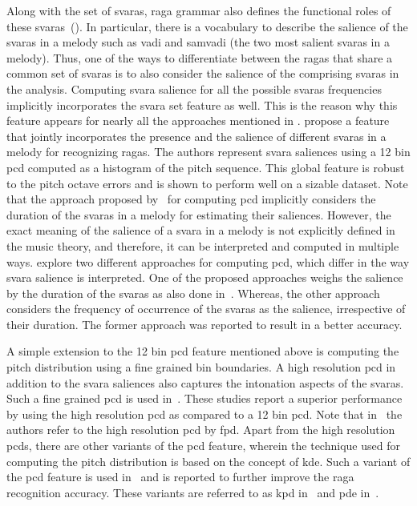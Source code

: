 Along with the set of \glspl{svara}, \gls{raga} grammar also defines the functional roles of these \glspl{svara}~(). In particular, there is a vocabulary to describe the salience of the \glspl{svara} in a melody such as \gls{vadi} and \gls{samvadi} (the two most salient \glspl{svara} in a melody). Thus, one of the ways to differentiate between the \glspl{raga} that share a common set of \glspl{svara} is to also consider the salience of the comprising \glspl{svara} in the analysis. Computing \gls{svara} salience for all the possible \glspl{svara} frequencies implicitly incorporates the \gls{svara} set feature as well. This is the reason why this feature appears for nearly all the approaches mentioned in . \cite{chordia2007raag} propose a feature that jointly incorporates the presence and the salience of different \glspl{svara} in a melody for recognizing \glspl{raga}. The authors represent \gls{svara} saliences using a 12 bin \gls{pcd} computed as a histogram of the pitch sequence. This global feature is robust to the pitch octave errors and is shown to perform well on a sizable dataset. Note that the approach proposed by~\cite{chordia2007raag} for computing \gls{pcd} implicitly considers the duration of the \glspl{svara} in a melody for estimating their saliences. However, the exact meaning of the salience of a \gls{svara} in a melody is not explicitly defined in the music theory, and therefore, it can be interpreted and computed in multiple ways. \cite{koduri2011survey} explore two different approaches for computing \gls{pcd}, which differ in the way \gls{svara} salience is interpreted. One of the proposed approaches weighs the salience by the duration of the \glspl{svara} as also done in~\cite{chordia2007raag}. Whereas, the other approach considers the frequency of occurrence of the \glspl{svara} as the salience, irrespective of their duration. The former approach was reported to result in a better accuracy.

A simple extension to the 12 bin \gls{pcd} feature mentioned above is computing the pitch distribution using a fine grained bin boundaries. A high resolution \gls{pcd} in addition to the \gls{svara} saliences also captures the intonation aspects of the \glspl{svara}. Such a fine grained \gls{pcd} is used in~\cite{chordia2013joint,koduri2012raga,belle2009raga,kumar2014identifying}. These studies report a superior performance by using the high resolution \gls{pcd} as compared to a 12 bin \gls{pcd}. Note that in~\cite{chordia2013joint} the authors refer to the high resolution \gls{pcd} by \gls{fpd}. Apart from the high resolution \glspl{pcd}, there are other variants of the \gls{pcd} feature, wherein the technique used for computing the pitch distribution is based on the concept of \gls{kde}. Such a variant of the \gls{pcd} feature is used in~\cite{chordia2013joint,ranjani2011carnatic} and is reported to further improve the \gls{raga} recognition accuracy. These variants are referred to as \gls{kpd} in~\cite{chordia2013joint} and \gls{pde} in~\cite{ranjani2011carnatic}. 


